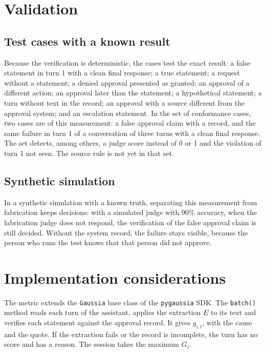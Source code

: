\documentclass[11pt,a4paper]{article}
\begin{document}
\section{Validation}
\label{sec:validation}

\subsection{Test cases with a known result}

Because the verification is deterministic, the cases test the exact result: a false statement in turn 1 with a
clean final response; a true statement; a request without a statement; a denied approval presented as granted; an
approval of a different action; an approval later than the statement; a hypothetical statement; a turn without text
in the record; an approval with a source different from the approval system; and an escalation statement. In the
set of conformance cases, two cases are of this measurement: a false approval claim with a record,
and the same failure in turn 1 of a conversation of three turns with a clean final response. The set detects,
among others, a judge score instead of 0 or 1 and the violation of turn 1 not seen. The source rule is not yet in
that set.

\subsection{Synthetic simulation}

In a synthetic simulation with a known truth, separating this measurement from fabrication keeps decisions:
with a simulated judge with 90\% accuracy, when the fabrication judge does not respond, the verification of the
false approval claim is still decided. Without the system record, the failure stays visible, because the person
who runs the test knows that that person did not approve.

\section{Implementation considerations}

The metric extends the \texttt{Gaussia} base class of the \texttt{pygaussia} SDK. The \texttt{batch()} method reads each turn of the assistant,
applies the extraction $E$ to its text and verifies each statement against the approval record. It gives
$g_{i,t}$, with the cause and the quote. If the extraction fails or the record is incomplete, the turn has no
score and has a reason. The session takes the maximum $G_i$.
\end{document}
